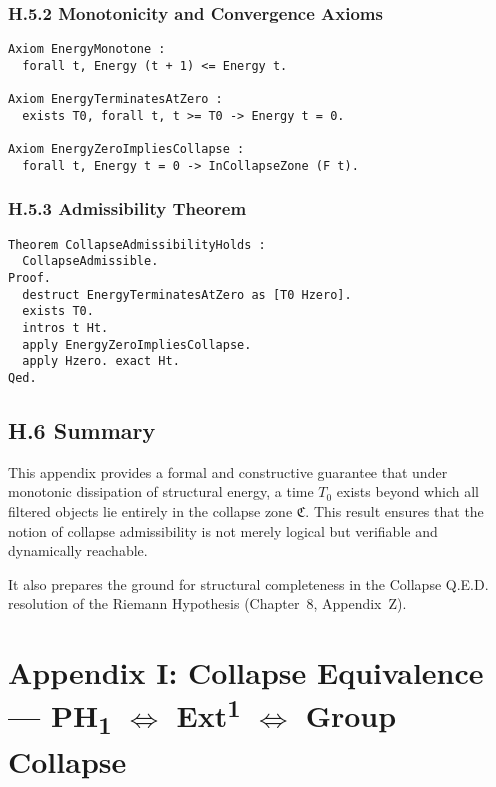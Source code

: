 \documentclass[11pt]{article}
\begin{document}
\subsubsection*{H.5.2 Monotonicity and Convergence Axioms}

\begin{lstlisting}[language=Coq, caption=Energy Monotonicity and Termination, captionpos=b]
Axiom EnergyMonotone :
  forall t, Energy (t + 1) <= Energy t.

Axiom EnergyTerminatesAtZero :
  exists T0, forall t, t >= T0 -> Energy t = 0.

Axiom EnergyZeroImpliesCollapse :
  forall t, Energy t = 0 -> InCollapseZone (F t).
\end{lstlisting}

\subsubsection*{H.5.3 Admissibility Theorem}

\begin{lstlisting}[language=Coq, caption=Formal Proof of CollapseAdmissibility, captionpos=b]
Theorem CollapseAdmissibilityHolds :
  CollapseAdmissible.
Proof.
  destruct EnergyTerminatesAtZero as [T0 Hzero].
  exists T0.
  intros t Ht.
  apply EnergyZeroImpliesCollapse.
  apply Hzero. exact Ht.
Qed.
\end{lstlisting}

\subsection*{H.6 Summary}

This appendix provides a formal and constructive guarantee that under monotonic dissipation of structural energy, a time \( T_0 \) exists beyond which all filtered objects lie entirely in the collapse zone \( \mathfrak{C} \). This result ensures that the notion of collapse admissibility is not merely logical but verifiable and dynamically reachable.

It also prepares the ground for structural completeness in the Collapse Q.E.D. resolution of the Riemann Hypothesis (Chapter~8, Appendix~Z).



\appendix
\section*{Appendix I: Collapse Equivalence — PH\textsubscript{1} $\iff$ Ext\textsuperscript{1} $\iff$ Group Collapse}
\end{document}
